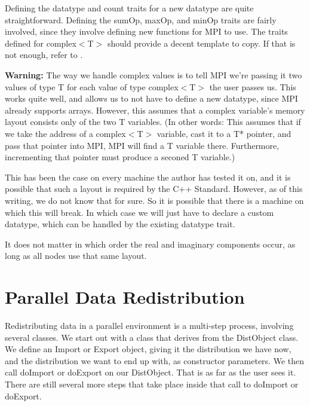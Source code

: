 \documentclass[10pt,relax]{TpetraDesign}
\begin{document}
Defining the datatype and count traits for a new datatype are quite straightforward. Defining the sumOp, maxOp, and minOp traits are fairly involved, since they involve defining new functions for MPI to use. The traits defined for complex$<$T$>$ should provide a decent template to copy. If that is not enough, refer to \cite{MPI}.

\textbf{Warning:} The way we handle complex values is to tell MPI we're passing it two values of type T for each value of type complex$<$T$>$ the user passes us. This works quite well, and allows us to not have to define a new datatype, since MPI already supports arrays. However, this assumes that a complex variable's memory layout consists only of the two T variables. (In other words: This assumes that if we take the address of a complex$<$T$>$ variable, cast it to a T* pointer, and pass that pointer into MPI, MPI will find a T variable there. Furthermore, incrementing that pointer must produce a seconed T variable.) 

This has been the case on every machine the author has tested it on, and it is possible that such a layout is required by the C++ Standard. However, as of this writing, we do not know that for sure. So it is possible that there is a machine on which this will break. In which case we will just have to declare a custom datatype, which can be handled by the existing datatype trait.

It does not matter in which order the real and imaginary components occur, as long as all nodes use that same layout.

%
\section{Parallel Data Redistribution}

Redistributing data in a parallel environment is a multi-step process, involving several classes. We start out with a class that derives from the DistObject class. We define an Import or Export object, giving it the distribution we have now, and the distribution we want to end up with, as constructor parameters. We then call doImport or doExport on our DistObject. That is as far as the user sees it. There are still several more steps that take place inside that call to doImport or doExport.

%
\end{document}

